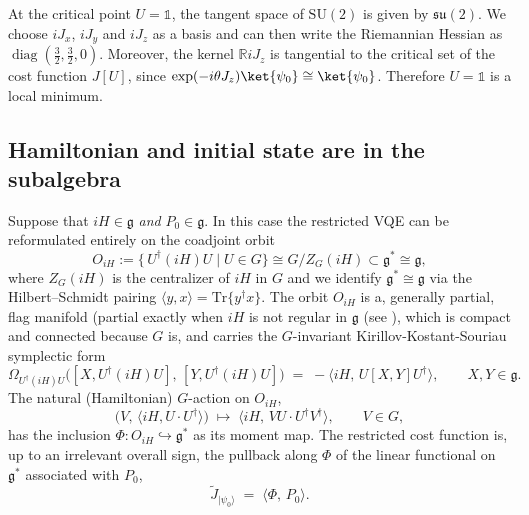 \documentclass{article}
\begin{document}
At the critical point \(U = \mathds{1}\), the tangent space of \(\mathrm{SU}(2)\) is given by \(\mathfrak{su}(2)\).
We choose \(iJ_x\), \(iJ_y\) and \(iJ_z\) as a basis and can then write the Riemannian Hessian as \(\operatorname{diag}(\frac{3}{2}, \frac{3}{2}, 0)\).
Moreover, the kernel \(\mathds{R}iJ_z\) is tangential to the critical set of the cost function \(J[U]\), since \(\exp(-i\theta J_z)\ket{\psi_0} \cong \ket{\psi_0}\).
Therefore \(U = \mathds{1}\) is a local minimum.

\subsection{Hamiltonian and initial state are in the subalgebra}
\label{app:subgroup-both}

Suppose that $iH\in\mathfrak g$ \emph{and} $P_0\in\mathfrak g$. In this case the restricted VQE can be reformulated entirely on the coadjoint orbit
\begin{equation}
O_{iH} := \{\, U^\dagger(iH)U \mid U\in G \} \cong G/Z_G(iH) \subset \mathfrak g^{*} \cong \mathfrak g,
\end{equation}
where $Z_G(iH)$ is the centralizer of $iH$ in $G$ and we identify $\mathfrak g^{*}\cong\mathfrak g$ via the Hilbert--Schmidt pairing $\langle y,x\rangle=\mathrm{Tr}\{y^\dagger x\}$. The orbit $O_{iH}$ is a, generally partial, flag manifold (partial exactly when $iH$ is not regular in $\mathfrak g$ (see \cite{Duistermaat83}), which is compact and connected because $G$ is, and carries the $G$-invariant Kirillov-Kostant-Souriau symplectic form
\begin{equation}
\Omega_{U^\dagger(iH)U}\big([X,U^\dagger(iH)U],\,[Y,U^\dagger(iH)U]\big) \;=\; -\big\langle iH,\, U[X,Y]U^\dagger\big\rangle, \qquad X,Y\in\mathfrak g.
\end{equation}
The natural (Hamiltonian) $G$-action on $O_{iH}$,
\begin{equation}
\big(V,\, \langle iH, U\cdot U^\dagger\rangle\big) \;\longmapsto\; \langle iH,\, VU\cdot U^\dagger V^\dagger\rangle, \qquad V\in G,
\end{equation}
has the inclusion $\Phi: O_{iH}\hookrightarrow \mathfrak g^{*}$ as its moment map. The restricted cost function is, up to an irrelevant overall sign, the pullback along $\Phi$ of the linear functional on $\mathfrak g^{*}$ associated with $P_0$,
\begin{equation}
\widetilde J_{\lvert\psi_0\rangle} \;=\; \langle \Phi,\, P_0\rangle .
\end{equation}
\end{document}
